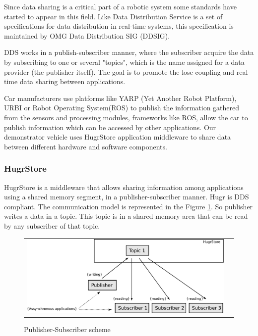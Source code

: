 Since data sharing is a critical part of a robotic system some standards have started to appear in this field. Like Data Distribution Service \cite{dds} is a set of specifications for data distribution in real-time systems, this specification is maintained by OMG Data Distribution SIG (DDSIG).

DDS works in a publish-subscriber manner, where the subscriber acquire the data by subscribing to one or several  "topics", which is the name assigned for a data provider (the publisher itself). The goal is to promote the lose coupling and real-time data sharing between applications.

Car manufacturers use platforms like YARP (Yet Another Robot Platform), URBI \cite{urbi} or Robot Operating System(ROS) \cite{ros} to publish the information gathered from the sensors and processing modules, frameworks like ROS, allow the car to publish information  which can be accessed by other applications.%
Our demonstrator vehicle uses HugrStore \cite{hugr} application middleware to share data between different hardware and software components.


\subsubsection{HugrStore}
HugrStore is a middleware that allows sharing information among applications using a shared memory segment, in a publisher-subscriber manner. Hugr is DDS compliant. The communication model is represented in the Figure \ref{fig:dds:hugr}. So publisher writes a data in a topic. This topic is in a shared memory area that can be read by any subscriber of that topic.

\begin{figure}[H]
   \centering
     \begin{tabular}{lr}
       \includegraphics[scale=0.50]{img/fig:dds:hugr}
     \end{tabular}
   \caption{Publisher-Subscriber scheme}
   \label{fig:dds:hugr}
\end{figure}

